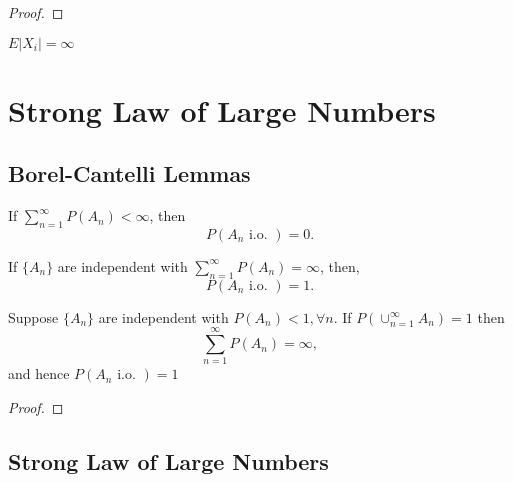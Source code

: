 \begin{proof}

\end{proof}

\begin{remark}
    $E|X_i|=\infty$
\end{remark}

\section{Strong Law of Large Numbers}

\subsection{Borel-Cantelli Lemmas}

\begin{lemma} \label{lem:borel-cantelli-lemma}
    If $\sum_{n=1}^{\infty}P\left(A_{n}\right)<\infty$, then
    \begin{equation}
        P\left(A_{n}\text{ i.o. }\right)=0.
    \end{equation}
\end{lemma}

\begin{lemma}
    If $\{A_n\}$ are independent with $\sum_{n=1}^{\infty}P\left(A_{n}\right)=\infty$, then,
    \begin{equation}
        P\left(A_{n}\text{ i.o. }\right)=1.
    \end{equation}
\end{lemma}

\begin{corollary}
    Suppose $\{A_{n}\}$ are independent with $P\left(A_{n}\right)<1,\forall n$. If $P\left(\cup_{n=1}^{\infty}A_{n}\right)=1$ then
    \begin{equation}
        \sum_{n=1}^{\infty}P\left(A_{n}\right)=\infty,
    \end{equation}
    and hence $P\left(A_{n}\text{ i.o. }\right)=1$
\end{corollary}

\begin{proof}

\end{proof}

\subsection{Strong Law of Large Numbers}

